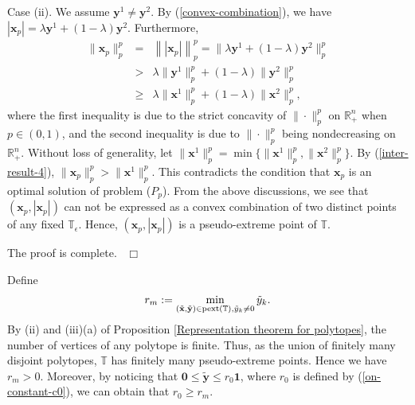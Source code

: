\documentclass[12pt]{article}
\def \ep{\hbox{ }\hfill$\Box$}
\begin{document}
Case (ii). We assume $\mathbf{y}^1\neq\mathbf{y}^2$. By (\ref{convex-combination}),
we have $|\mathbf{x}_p|=\lambda\mathbf{y}^1+(1-\lambda)\mathbf{y}^2$. Furthermore,
\begin{eqnarray}\label{inter-result-4}
\|\mathbf{x}_p\|_{p}^{p}&=&\left\||\mathbf{x}_p|\right\|_{p}^{p}=\|\lambda\mathbf{y}^1+(1-\lambda)\mathbf{y}^2\|^{p}_{p}\nonumber\\
                        &>&\lambda\|\mathbf{y}^1\|^{p}_{p}+(1-\lambda)\|\mathbf{y}^2\|^{p}_{p}\nonumber\\
                        &\geqslant&\lambda\|\mathbf{x}^1\|^{p}_{p}+(1-\lambda)\|\mathbf{x}^2\|^{p}_{p},
\end{eqnarray}
where the first inequality is due to  the strict concavity of $\|\cdot\|_{p}^{p}$ on
$\mathbb{R}^n_{+}$ when $p\in (0,1)$, and the second inequality is due to $\|\cdot\|_p^p$ being nondecreasing on $\mathbb{R}_+^n$. Without loss of generality, let $\|\mathbf{x}^1\|_{p}^{p}=\min\{\|\mathbf{x}^1\|_{p}^{p},\|\mathbf{x}^2\|_{p}^{p}\}$. By {\rm(\ref{inter-result-4})}, $\|\mathbf{x}_p\|_{p}^{p}>\|\mathbf{x}^1\|_{p}^{p}$. This contradicts the condition that $\mathbf{x}_p$
is an optimal solution of problem {\rm($P_p$)}.
From the above discussions, we see that $(\mathbf{x}_p,|\mathbf{x}_p|)$ can not be expressed as a convex combination of two distinct points of any fixed $\mathbb{T}_\epsilon$.
Hence, $(\mathbf{x}_p,|\mathbf{x}_p|)$ is a pseudo-extreme point of $\mathbb{T}$.

The proof is complete.
\ep

Define
\begin{eqnarray}\label{min-positive-coordinate-of-extreme-point}
r_m:=\min\limits_{(\tilde{\mathbf{x}},\tilde{\mathbf{y}})\in{\rm pext\left(\mathbb{T}\right)},\tilde{y}_k\neq 0 }{\tilde{y}_k}.
\end{eqnarray}
By (ii) and (iii)(a) of Proposition \ref{Representation theorem for polytopes}, the number of vertices of any polytope is finite. Thus, as the union of finitely many disjoint polytopes, $\mathbb{T}$ has finitely many pseudo-extreme points. Hence we have $ r_m>0$. Moreover, by noticing that $\mathbf{0}\leqslant\tilde{\mathbf{y}}\leqslant r_0\mathbf{1}$, where $r_0$ is defined by (\ref{on-constant-c0}), we can obtain that $r_0\geqslant r_m$.
\end{document}
